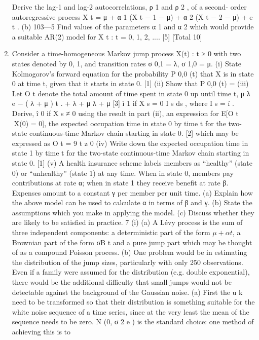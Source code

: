 \documentclass[a4paper,12pt]{article}
\begin{document}
\begin{enumerate}
Derive the lag-1 and lag-2 autocorrelations, ρ 1 and ρ 2 , of a second-
order autoregressive process
X t = μ + α 1 (X t − 1 − μ) + α 2 (X t − 2 − μ) + e t .
(b)
103—5
Find values of the parameters α 1 and α 2 which would provide a
suitable AR(2) model for {X t : t = 0, 1, 2, ...}.
[5]
[Total 10]
\item 
Consider a time-homogeneous Markov jump process {X(t) : t ≥ 0} with two states
denoted by 0, 1, and transition rates σ 0,1 = λ, σ 1,0 = μ.
(i) State Kolmogorov’s forward equation for the probability P 0,0 (t) that X is in
state 0 at time t, given that it starts in state 0.
[1]
(ii) Show that P 0,0 (t) =
(iii) Let O t denote the total amount of time spent in state 0 up until time t,
μ
λ
e − ( λ + μ ) t .
+
λ + μ λ + μ
[3]
ì 1 if X s = 0
I s ds , where I s = í
. Derive,
î 0 if X s ≠ 0
using the result in part (ii), an expression for E[O t X(0) = 0], the expected occupation time in state 0 by time t for the two-state continuous-time Markov chain starting in state 0.
[2]
which may be expressed as O t =
9
t
z 0
(iv) Write down the expected occupation time in state 1 by time t for the two-state continuous-time Markov chain starting in state 0.
[1]
(v) A health insurance scheme labels members as “healthy” (state 0) or “unhealthy” (state 1) at any time. When in state 0, members pay
contributions at rate α; when in state 1 they receive benefit at rate β.
Expenses amount to a constant γ per member per unit time.
(a) Explain how the above model can be used to calculate α in terms of β and γ.
(b) State the assumptions which you make in applying the model.
(c) Discuss whether they are likely to be satisfied in practice.
7
(i)
(a) A Lévy process is the sum of three independent components: a deterministic part of the form $\mu + \alpha t$, a Brownian part of the form
σB t and a pure jump part which may be thought of as a compound Poisson process.
(b) One problem would be in estimating the distribution of the jump sizes, particularly with only 250 observations. Even if a family were assumed for the distribution (e.g. double exponential), there would be the additional difficulty that small jumps would not be detectable against the background of the Gaussian noise.
(a) First the u k need to be transformed so that their distribution is something suitable for the white noise sequence of a time series,
since at the very least the mean of the sequence needs to be zero.
N (0, σ 2 e ) is the standard choice: one method of achieving this is to

\end{enumerate}
\end{document}
